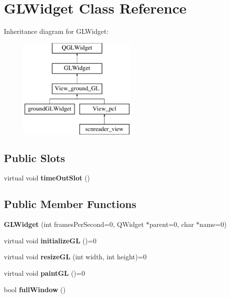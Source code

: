 \hypertarget{classGLWidget}{\section{G\-L\-Widget Class Reference}
\label{classGLWidget}
}
Inheritance diagram for G\-L\-Widget\-:\begin{figure}[H]
\begin{center}
\leavevmode
\includegraphics[height=5.000000cm]{classGLWidget}
\end{center}
\end{figure}
\subsection*{Public Slots}
\begin{DoxyCompactItemize}
\item 
\hypertarget{classGLWidget_af6539acfbeb3808ec22c23796631223a}{virtual void {\bfseries time\-Out\-Slot} ()}\label{classGLWidget_af6539acfbeb3808ec22c23796631223a}

\end{DoxyCompactItemize}
\subsection*{Public Member Functions}
\begin{DoxyCompactItemize}
\item 
\hypertarget{classGLWidget_a239ba4cdaf17dd41c6458db90e153211}{{\bfseries G\-L\-Widget} (int frames\-Per\-Second=0, Q\-Widget $\ast$parent=0, char $\ast$name=0)}\label{classGLWidget_a239ba4cdaf17dd41c6458db90e153211}

\item 
\hypertarget{classGLWidget_a8dcea17ae790967200534864412e4812}{virtual void {\bfseries initialize\-G\-L} ()=0}\label{classGLWidget_a8dcea17ae790967200534864412e4812}

\item 
\hypertarget{classGLWidget_a168f325cd90d1d5f6e2d27e1017d337f}{virtual void {\bfseries resize\-G\-L} (int width, int height)=0}\label{classGLWidget_a168f325cd90d1d5f6e2d27e1017d337f}

\item 
\hypertarget{classGLWidget_a3cad0d8f57b6253cf265d258ca327010}{virtual void {\bfseries paint\-G\-L} ()=0}\label{classGLWidget_a3cad0d8f57b6253cf265d258ca327010}

\item 
\hypertarget{classGLWidget_acee9343100914094424c31afd2603335}{bool {\bfseries full\-Window} ()}\label{classGLWidget_acee9343100914094424c31afd2603335}

\end{DoxyCompactItemize}
